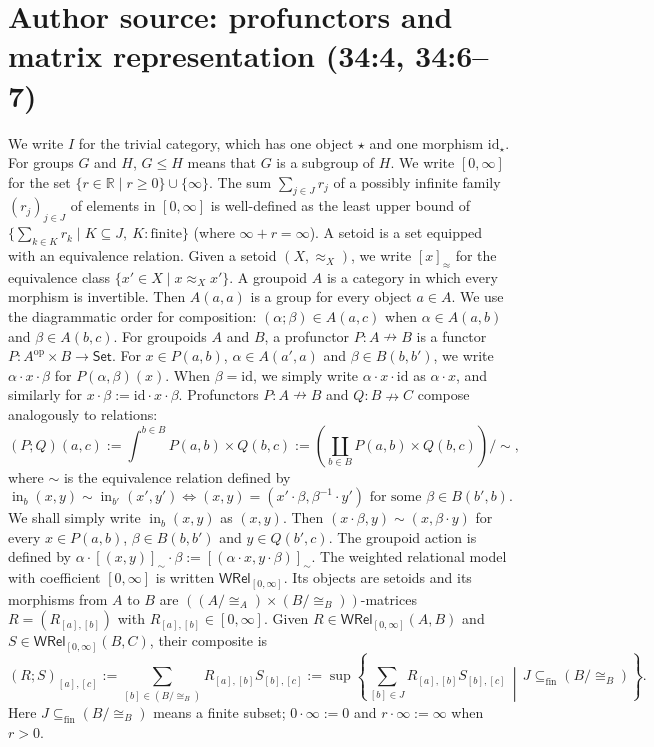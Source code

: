 \documentclass[10pt,a4paper]{article}
\newcommand{\pf}{\mathrel{\nrightarrow}}
\newcommand{\WRel}{\mathsf{WRel}_{[0,\infty]}}
\begin{document}
\section*{Author source: profunctors and matrix representation (34:4, 34:6--7)}
We write $I$ for the trivial category, which has one object $\star$ and one morphism $\mathrm{id}_\star$. For groups $G$ and $H$, $G\le H$ means that $G$ is a subgroup of $H$.
We write $[0,\infty]$ for the set $\{r\in\mathbb R\mid r\ge0\}\cup\{\infty\}$. The sum $\sum_{j\in J}r_j$ of a possibly infinite family $(r_j)_{j\in J}$ of elements in $[0,\infty]$ is well-defined as the least upper bound of $\{\sum_{k\in K}r_k\mid K\subseteq J,\ K:\text{finite}\}$ (where $\infty+r=\infty$).
A setoid is a set equipped with an equivalence relation. Given a setoid $(X,\approx_X)$, we write $[x]_\approx$ for the equivalence class $\{x'\in X\mid x\approx_Xx'\}$.
A groupoid $A$ is a category in which every morphism is invertible. Then $A(a,a)$ is a group for every object $a\in A$. We use the diagrammatic order for composition: $(\alpha;\beta)\in A(a,c)$ when $\alpha\in A(a,b)$ and $\beta\in A(b,c)$.
For groupoids $A$ and $B$, a profunctor $P:A\pf B$ is a functor $P:A^{\mathrm{op}}\times B\to\mathsf{Set}$. For $x\in P(a,b)$, $\alpha\in A(a',a)$ and $\beta\in B(b,b')$, we write $\alpha\cdot x\cdot\beta$ for $P(\alpha,\beta)(x)$. When $\beta=\mathrm{id}$, we simply write $\alpha\cdot x\cdot\mathrm{id}$ as $\alpha\cdot x$, and similarly for $x\cdot\beta:=\mathrm{id}\cdot x\cdot\beta$.
Profunctors $P:A\pf B$ and $Q:B\pf C$ compose analogously to relations:
\[
(P;Q)(a,c):=\int^{b\in B}P(a,b)\times Q(b,c)
 :=\left(\coprod_{b\in B}P(a,b)\times Q(b,c)\right)/{\sim},
\]
where $\sim$ is the equivalence relation defined by
\[
\operatorname{in}_b(x,y)\sim\operatorname{in}_{b'}(x',y')
\Longleftrightarrow
(x,y)=(x'\cdot\beta,\beta^{-1}\cdot y')\text{ for some }\beta\in B(b',b).
\]
We shall simply write $\operatorname{in}_b(x,y)$ as $(x,y)$. Then $(x\cdot\beta,y)\sim(x,\beta\cdot y)$ for every $x\in P(a,b)$, $\beta\in B(b,b')$ and $y\in Q(b',c)$. The groupoid action is defined by $\alpha\cdot[(x,y)]_\sim\cdot\beta:=[(\alpha\cdot x,y\cdot\beta)]_\sim$.
The weighted relational model with coefficient $[0,\infty]$ is written $\WRel$. Its objects are setoids and its morphisms from $A$ to $B$ are $((A/{\cong_A})\times(B/{\cong_B}))$-matrices $R=(R_{[a],[b]})$ with $R_{[a],[b]}\in[0,\infty]$.
Given $R\in\WRel(A,B)$ and $S\in\WRel(B,C)$, their composite is
\[
(R;S)_{[a],[c]}:=\sum_{[b]\in(B/{\cong_B})}R_{[a],[b]}S_{[b],[c]}
:=\sup\left\{\sum_{[b]\in J}R_{[a],[b]}S_{[b],[c]}
 \,\middle|\,J\subseteq_{\mathrm{fin}}(B/{\cong_B})\right\}.
\]
Here $J\subseteq_{\mathrm{fin}}(B/{\cong_B})$ means a finite subset; $0\cdot\infty:=0$ and $r\cdot\infty:=\infty$ when $r>0$.
\end{document}
